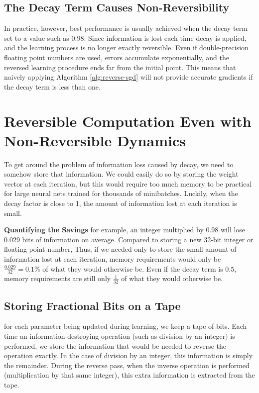 \documentclass{article}
\begin{document}
\subsection{The Decay Term Causes Non-Reversibility}
In practice, however, best performance is usually achieved when the decay term set to a value such as $0.98$.
Since information is lost each time decay is applied, and the learning process is no longer exactly reversible.
Even if double-precision floating point numbers are used, errors accumulate exponentially, and the reversed learning procedure ends far from the initial point.
This means that naively applying Algorithm \ref{alg:reverse-sgd} will not provide accurate gradients if the decay term is less than one.

\section{Reversible Computation Even with Non-Reversible Dynamics}

To get around the problem of information loss caused by decay, we need to somehow store that information.
We could easily do so by storing the weight vector at each iteration, but this would require too much memory to be practical for large neural nets trained for thousands of minibatches.
Luckily, when the decay factor is close to 1, the amount of information lost at each iteration is small.

\textbf{Quantifying the Savings}
for example, an integer multiplied by 0.98 will lose $0.029$ bits of information on average.
Compared to storing a new 32-bit integer or floating-point number, 
Thus, if we needed only to store the small amount of information lost at each iteration, memory requirements would only be ${\frac{0.029}{32} = 0.1\%}$ of what they would otherwise be.
Even if the decay term is $0.5$, memory requirements are still only $\frac{1}{32}$ of what they would otherwise be.

\subsection{Storing Fractional Bits on a Tape}

for each parameter being updated during learning, we keep a tape of bits.
Each time an information-destroying operation (such as division by an integer) is performed, we store the information that would be needed to reverse the operation exactly.  In the case of division by an integer, this information is simply the remainder.
During the reverse pass, when the inverse operation is performed (multiplication by that same integer), this extra information is extracted from the tape.
\end{document}

